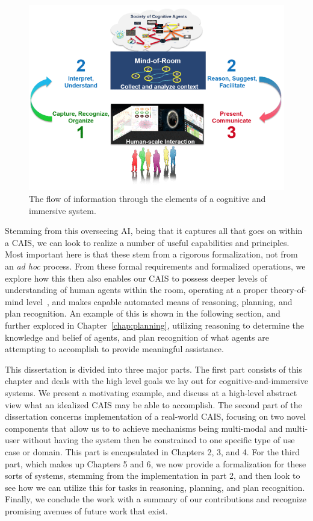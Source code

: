 \begin{figure}
\centering
\includegraphics[width=0.5\columnwidth]{chapters/01_introduction/figures/cisl-cycle-graphic.png}
\caption{The flow of information through the elements of a cognitive and immersive system.}
\label{fig:cycle-cais}
\end{figure}

Stemming from this overseeing AI, being that it captures all that goes
on within a CAIS, we can look to realize a number of useful
capabilities and principles. Most important here is that these stem
from a rigorous formalization, not from an \textit{ad hoc}
process. From these formal requirements and formalized operations, we
explore how this then also enables our CAIS to possess deeper levels
of understanding of human agents within the room, operating at a
proper theory-of-mind level~\cite{premack_does_1978}, and makes
capable automated means of reasoning, planning, and plan recognition.
An example of this is shown in the following section, and further
explored in Chapter~\ref{chap:planning}, utilizing reasoning to
determine the knowledge and belief of agents, and plan recognition of
what agents are attempting to accomplish to provide meaningful
assistance.

This dissertation is divided into three major parts. The first part
consists of this chapter and deals with the high level goals we lay
out for cognitive-and-immersive systems. We present a motivating
example, and discuss at a high-level abstract view what an idealized
CAIS may be able to accomplish. The second part of the dissertation
concerns implementation of a real-world CAIS, focusing on two novel
components that allow us to to achieve mechanisms being multi-modal
and multi-user without having the system then be constrained to one
specific type of use case or domain. This part is encapsulated in
Chapters 2, 3, and 4. For the third part, which makes up Chapters 5
and 6, we now provide a formalization for these sorts of systems,
stemming from the implementation in part 2, and then look to see how we
can utilize this for tasks in reasoning, planning, and plan
recognition. Finally, we conclude the work with a summary of our
contributions and recognize promising avenues of future work that
exist.
